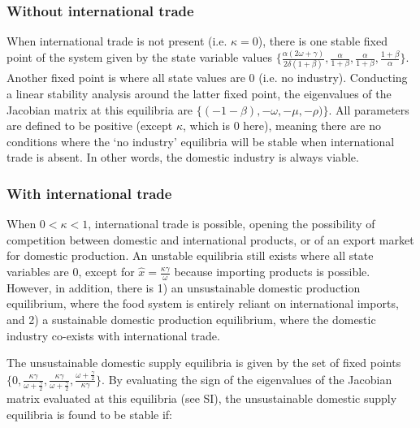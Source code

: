 \documentclass[9pt,twocolumn,twoside,lineno]{pnas-new}
\begin{document}
\subsubsection*{Without international trade}
When international trade is not present (i.e. $\kappa = 0$), there is one stable fixed point of the system given by the state variable values $\big \{\frac{\alpha(2\omega + \gamma)}{2 \delta (1 + \beta)}, \frac{\alpha}{1 + \beta}, \frac{\alpha}{1 + \beta}, \frac{1 + \beta}{\alpha}\big\}$. Another fixed point is where all state values are 0 (i.e. no industry). Conducting a linear stability analysis around the latter fixed point, the eigenvalues of the Jacobian matrix at this equilibria are $\{(-1 - \beta), - \omega, - \mu, - \rho)\}$. All parameters are defined to be positive (except $\kappa$, which is $0$ here), meaning there are no conditions where the `no industry' equilibria will be stable when international trade is absent. In other words, the domestic industry is always viable.

\subsubsection*{With international trade}
When $0 < \kappa < 1$, international trade is possible, opening the possibility of competition between domestic and international products, or of an export market for domestic production. An unstable equilibria still exists where all state variables are 0, except for $\hat{x} = \frac{\kappa \gamma}{\omega}$ because importing products is possible. However, in addition, there is 1) an unsustainable domestic production equilibrium, where the food system is entirely reliant on international imports, and 2) a sustainable domestic production equilibrium, where the domestic industry co-exists with international trade.

The unsustainable domestic supply equilibria is given by the set of fixed points $\{0, \frac{\kappa \gamma}{\omega + \frac{\gamma}{2}}, \frac{\kappa \gamma}{\omega + \frac{\gamma}{2}}, \frac{\omega + \frac{\gamma}{2}}{\kappa \gamma}\}$. By evaluating the sign of the eigenvalues of the Jacobian matrix evaluated at this equilibria (see SI), the unsustainable domestic supply equilibria is found to be stable if:
\end{document}
